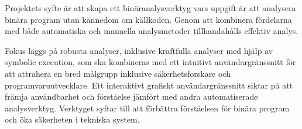 Projektets syfte är att skapa ett binäranalysverktyg vars uppgift är att analysera 
binära program utan kännedom om källkoden. Genom att kombinera fördelarna med både
automatiska och manuella analysmetoder tillhandahålls effektiv analys. 

Fokus läggs på robusta analyser, inklusive kraftfulla analyser med hjälp av symbolic execution, 
som ska kombineras med ett intuitivt användargränssnitt för att attrahera en bred
målgrupp inklusive säkerhetsforskare och programvaruutvecklare. Ett interaktivt grafiskt
användargränssnitt siktar på att främja användbarhet och förståelse jämfört med
andra automatiserade analysverktyg. Verktyget syftar till att förbättra
förståelsen för binära program och öka säkerheten i tekniska system.
